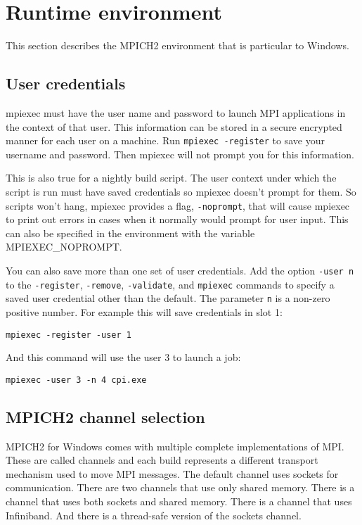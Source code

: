 \documentclass[dvipdfm,11pt]{article}
\begin{document}
\section{Runtime environment}

This section describes the MPICH2 environment that is particular to Windows.

\subsection{User credentials}
mpiexec must have the user name and password to launch MPI applications in the context of
that user.  This information can be stored in a secure encrypted manner for each user on a
machine.  Run \texttt{mpiexec -register} to save your username and password.  Then mpiexec
will not prompt you for this information.

This is also true for a nightly build script.  The user context under which the script is 
run must have saved credentials so mpiexec doesn't prompt for them.  So scripts won't hang,
mpiexec provides a flag, \texttt{-noprompt}, that will cause mpiexec to print out errors in 
cases when it normally would prompt for user input.  This can also be specified in the 
environment with the variable MPIEXEC\_NOPROMPT.

You can also save more than one set of user credentials.  Add the option \texttt{-user n}
to the \texttt{-register}, \texttt{-remove}, \texttt{-validate}, and \texttt{mpiexec}
commands to specify a saved user credential other than the default.  The parameter \texttt{n}
is a non-zero positive number.  For example this will save credentials in slot 1:
\begin{verbatim}
mpiexec -register -user 1
\end{verbatim}
And this command will use the user 3 to launch a job:
\begin{verbatim}
mpiexec -user 3 -n 4 cpi.exe
\end{verbatim}

\subsection{MPICH2 channel selection}
MPICH2 for Windows comes with multiple complete implementations of MPI.  These are called
channels and each build represents a different transport mechanism used to move MPI messages.
The default channel uses sockets for communication.  There are two channels that use only
shared memory.  There is a channel that uses both sockets and shared memory.  There is a
channel that uses Infiniband.  And there is a thread-safe version of the sockets channel.
\end{document}

